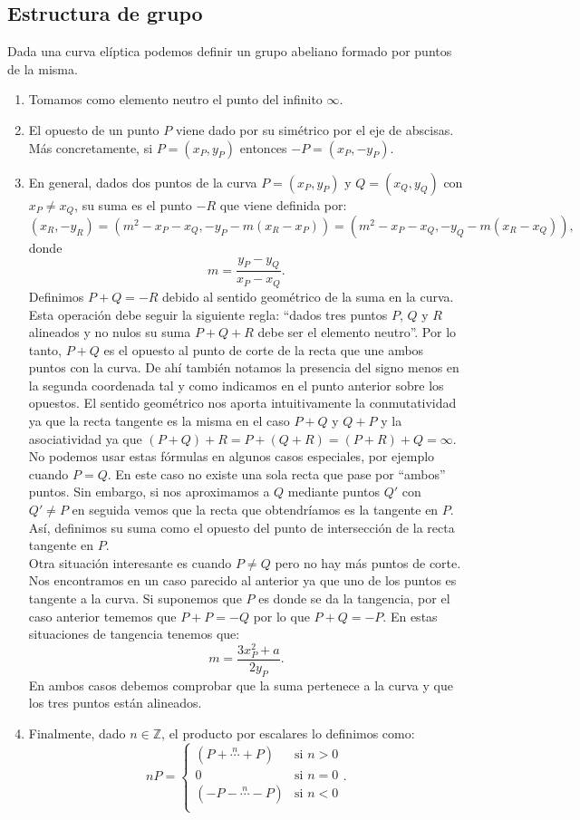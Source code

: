 \documentclass[11pt]{article}
\begin{document}
\subsection{Estructura de grupo}
Dada una curva elíptica podemos definir un grupo abeliano formado por puntos de la misma. 
\begin{enumerate}
\item Tomamos como elemento neutro el punto del infinito $\infty$.
\item El opuesto de un punto $ P $ viene dado por su simétrico por el eje de abscisas. Más concretamente, si $ P = (x_P, y_P) $ entonces $ -P = (x_P, -y_P) $.
\item En general, dados dos puntos de la curva $ P = (x_P, y_P) $ y $ Q = (x_Q, y_Q) $ con $ x_P \neq x_Q $, su suma es el punto $ -R $ que viene definida por:
\[
(x_R, -y_R) =(m^2 − x_P − x_Q, -y_P - m(x_R − x_P )) = (m^2 − x_P − x_Q, -y_Q - m(x_R − x_Q )),
\]
donde
\[
m = \frac{y_P-y_Q}{x_P-x_Q}.
\]
Definimos $ P+Q=-R $ debido al sentido geométrico de la suma en la curva. Esta operación debe seguir la siguiente regla: ``dados tres puntos $ P$, $ Q $ y $ R $ alineados y no nulos su suma $ P + Q + R $ debe ser el elemento neutro''. Por lo tanto, $ P +Q $ es el opuesto al punto de corte de la recta que une ambos puntos con la curva. De ahí también notamos la presencia del signo menos en la segunda coordenada tal y como indicamos en el punto anterior sobre los opuestos. El sentido geométrico nos aporta intuitivamente la conmutatividad ya que la recta tangente es la misma en el caso $ P+Q $ y $ Q+P $ y la asociatividad ya que $ (P+Q) + R = P + (Q+R) = (P+R) + Q = \infty$.\\

No podemos usar estas fórmulas en algunos casos especiales, por ejemplo cuando $ P=Q $. En este caso no existe una sola recta que pase por ``ambos'' puntos. Sin embargo, si nos aproximamos a $ Q $ mediante puntos $ Q' $ con $ Q' \neq P $ en seguida vemos que la recta que obtendríamos es la tangente en $ P $. Así, definimos su suma como el opuesto del punto de intersección de la recta tangente en $ P $.\\
Otra situación interesante es cuando $ P \neq Q $ pero no hay más puntos de corte. Nos encontramos en un caso parecido al anterior ya que uno de los puntos es tangente a la curva. Si suponemos que $ P $ es donde se da la tangencia, por el caso anterior tememos que $ P + P = -Q $ por lo que $ P + Q = -P $. En estas situaciones de tangencia tenemos que:
\[
m = \frac{3x^{2}_P + a}{2y_P}.
\]
En ambos casos debemos comprobar que la suma pertenece a la curva y que los tres puntos están alineados.

\item Finalmente, dado $ n \in \mathbb{Z} $, el producto por escalares lo definimos como:
\[   
nP = 
\begin{cases}
 (P+\stackrel{n}{\cdots}+P) &\text{si } n > 0\\
0 &\text{si } n = 0\\
(-P-\stackrel{n}{\cdots}-P) &\text{si } n < 0\\
\end{cases}.
\]
\end{enumerate}
\end{document}

